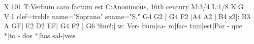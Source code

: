 X:101
T:Verbum caro factum est
C:Anonimous, 16th century
M:3/4
L:1/8
K:G
V:1 clef=treble name="Soprano" sname="S."
G4 G2 | G4 F2 |A4 A2 | B4 z2|: B3 A GF| E2 D2 EF| G4 F2 | G6 !fine!:|
w: Ver- bum|ca- ro|fac- tum|est|Por - que *|to - dos *|hos sal-|veis
